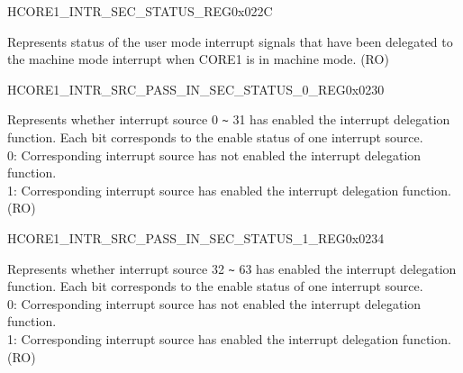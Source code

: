 \begin{register}{H}{CORE1\_INTR\_SEC\_STATUS\_REG}{0x022C}\label{regdesc:CORE1INTRSECSTATUSREG}
%
\regnewline%
\begin{regdesc}\begin{reglist}
\label{fielddesc:CORE1INTRSECSTATUS3}\item [CORE1\_INTR\_SEC\_STATUS] Represents status of the user mode interrupt signals that have been delegated to the machine mode interrupt when CORE1 is in machine mode. (RO)
\end{reglist}\end{regdesc}
\end{register}

\begin{register}{H}{CORE1\_INTR\_SRC\_PASS\_IN\_SEC\_STATUS\_0\_REG}{0x0230}\label{regdesc:CORE1INTRSRCPASSINSECSTATUS0REG}
%
\regnewline%
\begin{regdesc}\begin{reglist}
\label{fielddesc:CORE1INTRSRCPASSINSECSTATUS0}\item [CORE1\_INTR\_SRC\_PASS\_IN\_SEC\_STATUS\_0] Represents whether interrupt source 0 \verb+~+ 31 has enabled the interrupt delegation function. Each bit corresponds to the enable status of one interrupt source.\\
0: Corresponding interrupt source has not enabled the interrupt delegation function. \\
1: Corresponding interrupt source has enabled the interrupt delegation function. \\
(RO)
\end{reglist}\end{regdesc}
\end{register}

\begin{register}{H}{CORE1\_INTR\_SRC\_PASS\_IN\_SEC\_STATUS\_1\_REG}{0x0234}\label{regdesc:CORE1INTRSRCPASSINSECSTATUS1REG}
%
\regnewline%
\begin{regdesc}\begin{reglist}
\label{fielddesc:CORE1INTRSRCPASSINSECSTATUS1}\item [CORE1\_INTR\_SRC\_PASS\_IN\_SEC\_STATUS\_1] Represents whether interrupt source 32 \verb+~+ 63 has enabled the interrupt delegation function. Each bit corresponds to the enable status of one interrupt source.\\
0: Corresponding interrupt source has not enabled the interrupt delegation function.\\
1: Corresponding interrupt source has enabled the interrupt delegation function.\\
(RO)
\end{reglist}\end{regdesc}
\end{register}

